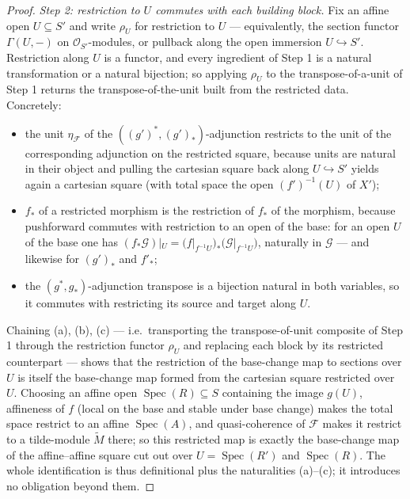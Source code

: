 \begin{proof}
  \medskip
  \emph{Step 2: restriction to \(U\) commutes with each building block.} Fix an affine
  open \(U \subseteq S'\) and write \(\rho_U\) for restriction to \(U\) —
  equivalently, the section functor \(\Gamma(U, -)\) on \(\mathcal{O}_{S'}\)-modules,
  or pullback along the open immersion \(U \hookrightarrow S'\). Restriction along
  \(U\) is a functor, and every ingredient of Step 1 is a natural transformation or a
  natural bijection; so applying \(\rho_U\) to the transpose-of-a-unit of Step 1
  returns the transpose-of-the-unit built from the restricted data. Concretely:
  \begin{itemize}
    \item[(a)] the unit \(\eta_{\mathcal{F}}\) of the \(((g')^*, (g')_*)\)-adjunction
      restricts to the unit of the corresponding adjunction on the restricted square,
      because units are natural in their object and pulling the cartesian square back
      along \(U \hookrightarrow S'\) yields again a cartesian square (with total space
      the open \((f')^{-1}(U)\) of \(X'\));
    \item[(b)] \(f_*\) of a restricted morphism is the restriction of \(f_*\) of the
      morphism, because pushforward commutes with restriction to an open of the base:
      for an open \(U\) of the base one has
      \((f_*\mathcal{G})|_U = (f|_{f^{-1}U})_*\bigl(\mathcal{G}|_{f^{-1}U}\bigr)\),
      naturally in \(\mathcal{G}\) — and likewise for \((g')_*\) and \(f'_*\);
    \item[(c)] the \((g^*, g_*)\)-adjunction transpose is a bijection natural in both
      variables, so it commutes with restricting its source and target along \(U\).
  \end{itemize}
  Chaining (a), (b), (c) — i.e.\ transporting the transpose-of-unit composite of
  Step 1 through the restriction functor \(\rho_U\) and replacing each block by its
  restricted counterpart — shows that the restriction of the base-change map to
  sections over \(U\) is itself the base-change map formed from the cartesian square
  restricted over \(U\). Choosing an affine open
  \(\operatorname{Spec}(R) \subseteq S\) containing the image \(g(U)\), affineness of
  \(f\) (local on the base and stable under base change) makes the total space
  restrict to an affine \(\operatorname{Spec}(A)\), and quasi-coherence of
  \(\mathcal{F}\) makes it restrict to a tilde-module \(\widetilde{M}\) there; so this
  restricted map is exactly the base-change map of the affine--affine square cut out
  over \(U = \operatorname{Spec}(R')\) and \(\operatorname{Spec}(R)\). The whole
  identification is thus definitional plus the naturalities (a)--(c); it introduces no
  obligation beyond them.


\end{proof}
